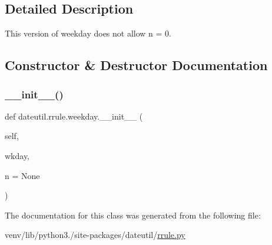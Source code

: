 \subsection{Detailed Description}
\begin{DoxyVerb}This version of weekday does not allow n = 0.
\end{DoxyVerb}
 

\subsection{Constructor \& Destructor Documentation}
\mbox{\label{classdateutil_1_1rrule_1_1weekday_a9eb2e55dd6a0c0a8125967b6225327cc}} 
\subsubsection{\texorpdfstring{\+\_\+\+\_\+init\+\_\+\+\_\+()}{\_\_init\_\_()}}
{\footnotesize\ttfamily def dateutil.\+rrule.\+weekday.\+\_\+\+\_\+init\+\_\+\+\_\+ (\begin{DoxyParamCaption}\item[{}]{self,  }\item[{}]{wkday,  }\item[{}]{n = {\ttfamily None} }\end{DoxyParamCaption})}



The documentation for this class was generated from the following file\+:\begin{DoxyCompactItemize}
\item 
venv/lib/python3./site-\/packages/dateutil/\hyperlink{rrule_8py}{rrule.\+py}\end{DoxyCompactItemize}
